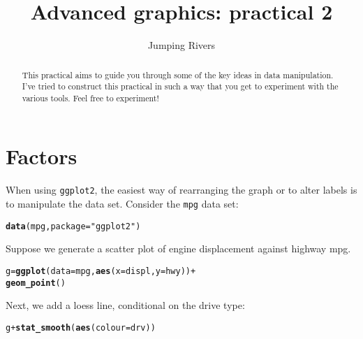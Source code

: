 \documentclass[a4paper,justified,openany]{tufte-handout}\usepackage[]{graphicx}\usepackage[]{color}
\title{Advanced graphics: practical 2 }
\author[Jumping Rivers]{Jumping Rivers}
\date{}  %
\makeatletter
\newcommand{\hlstr}[1]{\textcolor[rgb]{0.2,0.2,0.2}{#1}}%
\newcommand{\hlopt}[1]{\textcolor[rgb]{0.102,0.102,0.102}{#1}}%
\newcommand{\hlstd}[1]{\textcolor[rgb]{0.102,0.102,0.102}{#1}}%
\newcommand{\hlkwb}[1]{\textcolor[rgb]{0.102,0.102,0.102}{#1}}%
\newcommand{\hlkwc}[1]{\textcolor[rgb]{0.2,0.2,0.2}{#1}}%
\newcommand{\hlkwd}[1]{\textcolor[rgb]{0.102,0.102,0.102}{\textbf{#1}}}%
\newenvironment{kframe}{%
 \def\at@end@of@kframe{}%
 \ifinner\ifhmode%
  \def\at@end@of@kframe{\end{minipage}}%
  \begin{minipage}{\columnwidth}%
 \fi\fi%
 \def\FrameCommand##1{\hskip\@totalleftmargin \hskip-\fboxsep
 \colorbox{shadecolor}{##1}\hskip-\fboxsep
     \hskip-\linewidth \hskip-\@totalleftmargin \hskip\columnwidth}%
 \MakeFramed {\advance\hsize-\width
   \@totalleftmargin\z@ \linewidth\hsize
   \@setminipage}}%
 {\par\unskip\endMakeFramed%
 \at@end@of@kframe}
\newenvironment{knitrout}{}{} %
\newcommand{\cc}{\texttt}
\makeatother
\begin{document}
\maketitle%

\begin{abstract}
  \noindent This practical aims to guide you through some of the key ideas in
  data manipulation. I've tried to construct this practical in such a way that
  you get to experiment with the various tools. Feel free to experiment!
\end{abstract}


\section{Factors}

When using \cc{ggplot2}, the easiest way of rearranging the graph or to alter labels
is to manipulate the data set. Consider the \cc{mpg} data set:

\begin{knitrout}
\color{fgcolor}\begin{kframe}
\begin{alltt}
\hlkwd{data}\hlstd{(mpg,} \hlkwc{package} \hlstd{=} \hlstr{"ggplot2"}\hlstd{)}
\end{alltt}
\end{kframe}
\end{knitrout}

Suppose we generate a scatter plot of engine displacement against highway mpg.

\begin{knitrout}
\color{fgcolor}\begin{kframe}
\begin{alltt}
\hlstd{g} \hlkwb{=} \hlkwd{ggplot}\hlstd{(}\hlkwc{data}\hlstd{=mpg,} \hlkwd{aes}\hlstd{(}\hlkwc{x}\hlstd{=displ,} \hlkwc{y}\hlstd{=hwy))} \hlopt{+}
  \hlkwd{geom_point}\hlstd{()}
\end{alltt}
\end{kframe}
\end{knitrout}

\noindent Next, we add a loess line, conditional on the drive type:

\begin{knitrout}
\color{fgcolor}\begin{kframe}
\begin{alltt}
\hlstd{g} \hlopt{+} \hlkwd{stat_smooth}\hlstd{(}\hlkwd{aes}\hlstd{(}\hlkwc{colour}\hlstd{=drv))}
\end{alltt}
\end{kframe}
\end{knitrout}
\end{document}
